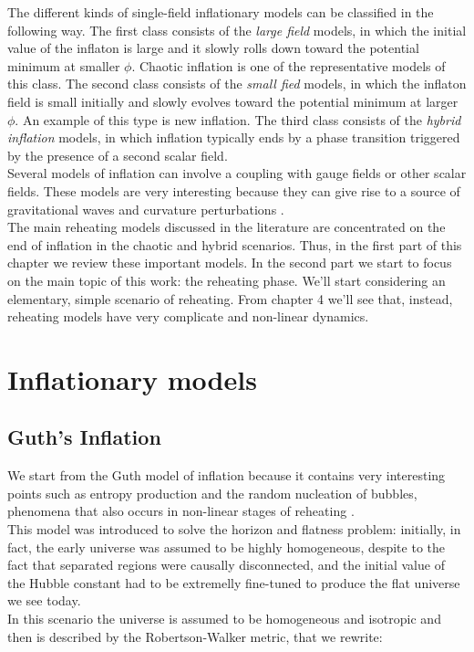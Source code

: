 \documentclass[11pt,a4paper,twoside]{book}
\begin{document}
The different kinds of single-field inflationary models can be classified in the following way. The first class consists of the \textit{large field} models, in which the initial value of the inflaton is large and it slowly rolls down toward  the potential minimum at smaller $\phi$. Chaotic inflation is one of the representative models of this class. The second class consists of the \textit{small fied} models, in which the inflaton field is small initially and slowly evolves toward the potential minimum at larger $\phi$. An example of this type is new inflation. The third class consists of the \textit{hybrid inflation} models, in which inflation typically ends by a phase transition triggered by the presence of a second scalar field.\\
Several models of inflation can involve a coupling with gauge fields or other scalar fields. These models are very interesting because they can give rise to a source of gravitational waves and curvature perturbations \cite{GWFromInflation:Intro}. \\
The main reheating models discussed in the literature are concentrated on the end of inflation in the chaotic and hybrid scenarios. Thus, in the first part of this chapter we review these important models. In the second part  we start to focus on the main topic of this work: the reheating phase. We'll start considering an elementary, simple scenario of reheating. From chapter 4 we'll see that, instead, reheating models have very complicate and non-linear dynamics. 

\section{Inflationary models}
\subsection{Guth's Inflation}
We start from the Guth model of inflation because it contains very interesting points such as entropy production and the random nucleation of bubbles, phenomena that also occurs in non-linear stages of reheating \cite{Guth:Intro}.\\
This model was introduced to solve the horizon and flatness problem: initially, in fact, the early universe was assumed to be highly homogeneous, despite to the fact that separated regions were causally disconnected, and the initial value of the Hubble constant had to be extremelly fine-tuned to produce the flat universe we see today.\\
In this scenario the universe is assumed to be homogeneous and isotropic and then is described by the Robertson-Walker metric, that we rewrite:
\end{document}
